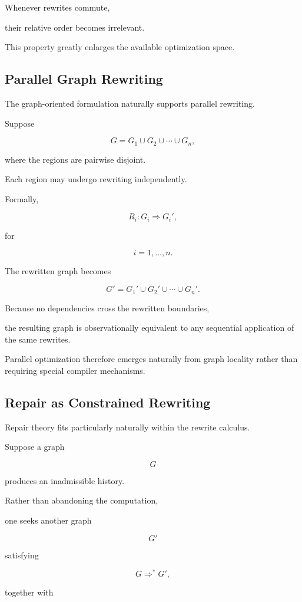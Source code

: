 \documentclass[12pt,oneside]{article}
\begin{document}
Whenever rewrites commute,

their relative order becomes irrelevant.

This property greatly enlarges the available optimization space.

\subsection{Parallel Graph Rewriting}

The graph-oriented formulation naturally supports parallel rewriting.

Suppose

\[
G
=
G_1
\cup
G_2
\cup
\cdots
\cup
G_n,
\]

where the regions are pairwise disjoint.

Each region may undergo rewriting independently.

Formally,

\[
R_i
:
G_i
\Longrightarrow
G_i',
\]

for

\[
i=1,\ldots,n.
\]

The rewritten graph becomes

\[
G'
=
G_1'
\cup
G_2'
\cup
\cdots
\cup
G_n'.
\]

Because no dependencies cross the rewritten boundaries,

the resulting graph is observationally equivalent to any sequential application of the same rewrites.

Parallel optimization therefore emerges naturally from graph locality rather than requiring special compiler mechanisms.

\subsection{Repair as Constrained Rewriting}

Repair theory fits particularly naturally within the rewrite calculus.

Suppose a graph

\[
G
\]

produces an inadmissible history.

Rather than abandoning the computation,

one seeks another graph

\[
G'
\]

satisfying

\[
G
\Longrightarrow^*
G',
\]

together with
\end{document}
